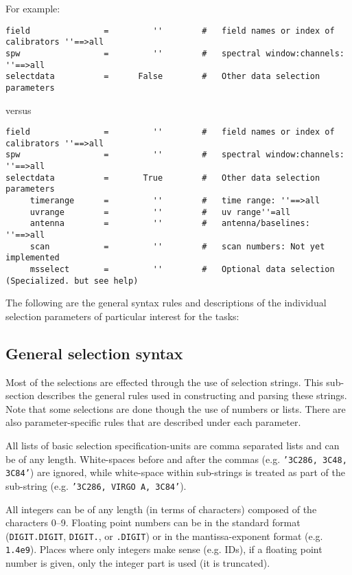 For example:
\small
\begin{verbatim}
field               =         ''        #   field names or index of calibrators ''==>all
spw                 =         ''        #   spectral window:channels: ''==>all
selectdata          =      False        #   Other data selection parameters
\end{verbatim}
\normalsize
versus
\small
\begin{verbatim}
field               =         ''        #   field names or index of calibrators ''==>all
spw                 =         ''        #   spectral window:channels: ''==>all
selectdata          =       True        #   Other data selection parameters
     timerange      =         ''        #   time range: ''==>all 
     uvrange        =         ''        #   uv range''=all
     antenna        =         ''        #   antenna/baselines: ''==>all
     scan           =         ''        #   scan numbers: Not yet implemented
     msselect       =         ''        #   Optional data selection (Specialized. but see help)

\end{verbatim}
\normalsize

The following are the general syntax rules and descriptions of the
individual selection parameters of particular interest for the tasks:

\subsection{General selection syntax}
\label{section:io.selection.syntax}

Most of the selections are effected through the use of selection
strings.  This sub-section describes the general rules used in
constructing and parsing these strings.  Note that some selections
are done though the use of numbers or lists.  There are also 
parameter-specific rules that are described under each parameter.

All lists of basic selection specification-units are comma separated
lists and can be of any length.  White-spaces before and after the
commas (e.g. {\tt '3C286, 3C48, 3C84'}) are ignored, while white-space 
within sub-strings is treated as part of the sub-string 
(e.g. {\tt '3C286, VIRGO A, 3C84'}).

All integers can be of any length (in terms of characters) composed of
the characters 0--9.  Floating point numbers can be in the standard
format ({\tt DIGIT.DIGIT}, {\tt DIGIT.}, or {\tt .DIGIT}) or in the 
mantissa-exponent format (e.g. {\tt 1.4e9}).  Places where only 
integers make sense (e.g. IDs), if a floating point number is given, 
only the integer part is used (it is truncated).

